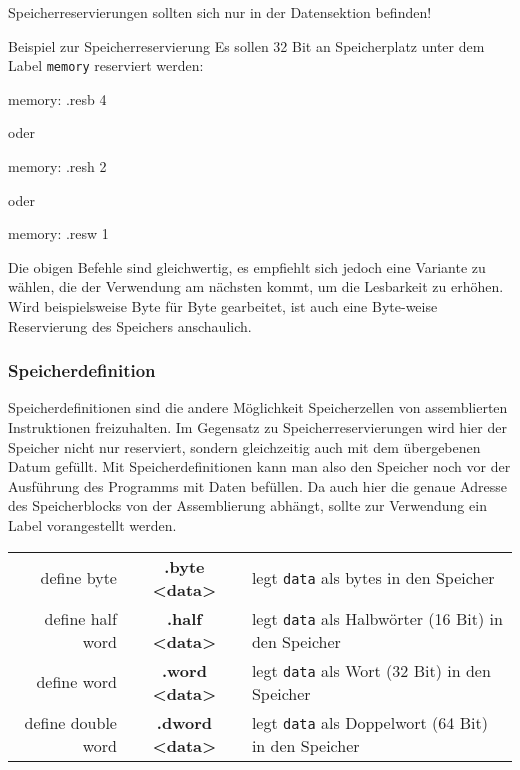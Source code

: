 \begin{warningblock}
	Speicherreservierungen sollten sich nur in der Datensektion befinden!
\end{warningblock}

\begin{exampleblock}{Beispiel zur Speicherreservierung}
	Es sollen 32 Bit an Speicherplatz unter dem Label \texttt{memory} reserviert werden:
	\begin{riscv}
	memory: .resb 4
	\end{riscv}
	oder
	\begin{riscv}
	memory: .resh 2
	\end{riscv}
	oder
	\begin{riscv}
	memory: .resw 1
	\end{riscv}
	Die obigen Befehle sind gleichwertig, es empfiehlt sich jedoch eine Variante zu wählen, die der Verwendung am nächsten kommt, um die Lesbarkeit zu erhöhen. Wird beispielsweise Byte für Byte gearbeitet, ist auch eine Byte-weise Reservierung des Speichers anschaulich.
\end{exampleblock}

\subsubsection{Speicherdefinition}

Speicherdefinitionen sind die andere Möglichkeit Speicherzellen von
assemblierten Instruktionen freizuhalten. Im Gegensatz zu Speicherreservierungen
wird hier der Speicher nicht nur reserviert, sondern gleichzeitig auch mit dem
übergebenen Datum gefüllt. Mit Speicherdefinitionen kann man also den Speicher
noch vor der Ausführung des Programms mit Daten befüllen. Da auch hier die
genaue Adresse des Speicherblocks von der Assemblierung abhängt, sollte zur
Verwendung ein Label vorangestellt werden.\\

\begin{centering}
	\begin{tabular}{rcl}
		define byte & \textbf{.byte <data>} & legt \texttt{data} als bytes in den Speicher\\
		define half word & \textbf{.half <data>} & legt \texttt{data} als Halbwörter (16 Bit) in den Speicher\\
		define word & \textbf{.word <data>} & legt \texttt{data} als Wort (32 Bit) in den Speicher\\
		define double word & \textbf{.dword <data>} & legt \texttt{data} als Doppelwort (64 Bit) in den Speicher\\
	\end{tabular}
\end{centering}

